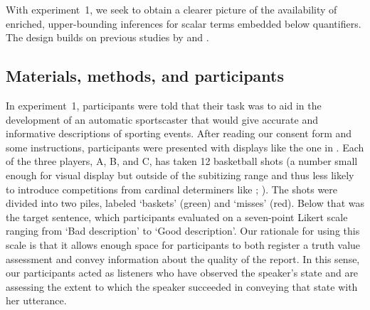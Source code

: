 \documentclass[leqno]{article}
\begin{document}
With experiment~1, we seek to obtain a clearer picture of the
availability of enriched, upper-bounding inferences for scalar terms
embedded below quantifiers. The design builds on previous studies by
\citet{Geurts:Pouscoulous:2009} and \citet{Chemla:Spector:2011}.


\subsection{Materials, methods, and participants}


In experiment~1, participants were told that their task was to aid in
the development of an automatic sportscaster that would give accurate
and informative descriptions of sporting events. After reading our
consent form and some instructions, participants were presented with
displays like the one in . Each of the three players,
A, B, and C, has taken 12 basketball shots (a number small enough for
visual display but outside of the subitizing range and thus less
likely to introduce competitions from cardinal determiners like
; \citealt{Degen:Tanenhaus:2014}). The shots were
divided into two piles, labeled `baskets' (green) and `misses'
(red). Below that was the target sentence, which participants
evaluated on a seven-point Likert scale ranging from `Bad description'
to `Good description'. Our rationale for using this scale is that it
allows enough space for participants to both register a truth value
assessment and convey information about the quality of the report. In
this sense, our participants acted as listeners who have observed the
speaker's state and are assessing the extent to which the speaker
succeeded in conveying that state with her utterance.
\end{document}
